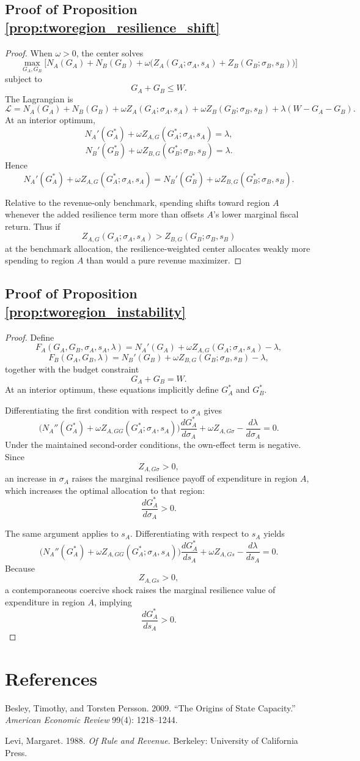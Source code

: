 \documentclass[12pt]{article}
\begin{document}
\subsection{Proof of Proposition \ref{prop:tworegion_resilience_shift}}

\begin{proof}
When $\omega>0$, the center solves
\[
\max_{G_A,G_B}
\Big[
N_A(G_A)+N_B(G_B)+\omega\bigl(Z_A(G_A;\sigma_A,s_A)+Z_B(G_B;\sigma_B,s_B)\bigr)
\Big]
\]
subject to
\[
G_A+G_B\le W.
\]
The Lagrangian is
\[
\mathcal L=
N_A(G_A)+N_B(G_B)+\omega Z_A(G_A;\sigma_A,s_A)+\omega Z_B(G_B;\sigma_B,s_B)
+\lambda(W-G_A-G_B).
\]
At an interior optimum,
\[
N_A'(G_A^*)+\omega Z_{A,G}(G_A^*;\sigma_A,s_A)=\lambda,
\]
\[
N_B'(G_B^*)+\omega Z_{B,G}(G_B^*;\sigma_B,s_B)=\lambda.
\]
Hence
\[
N_A'(G_A^*)+\omega Z_{A,G}(G_A^*;\sigma_A,s_A)
=
N_B'(G_B^*)+\omega Z_{B,G}(G_B^*;\sigma_B,s_B).
\]

Relative to the revenue-only benchmark, spending shifts toward region $A$ whenever the added resilience term more than offsets $A$'s lower marginal fiscal return. Thus if
\[
Z_{A,G}(G_A;\sigma_A,s_A)>Z_{B,G}(G_B;\sigma_B,s_B)
\]
at the benchmark allocation, the resilience-weighted center allocates weakly more spending to region $A$ than would a pure revenue maximizer.
\end{proof}

\subsection{Proof of Proposition \ref{prop:tworegion_instability}}

\begin{proof}
Define
\[
F_A(G_A,G_B,\sigma_A,s_A,\lambda)
=
N_A'(G_A)+\omega Z_{A,G}(G_A;\sigma_A,s_A)-\lambda,
\]
\[
F_B(G_A,G_B,\lambda)
=
N_B'(G_B)+\omega Z_{B,G}(G_B;\sigma_B,s_B)-\lambda,
\]
together with the budget constraint
\[
G_A+G_B=W.
\]
At an interior optimum, these equations implicitly define $G_A^*$ and $G_B^*$.

Differentiating the first condition with respect to $\sigma_A$ gives
\[
\Big(N_A''(G_A^*)+\omega Z_{A,GG}(G_A^*;\sigma_A,s_A)\Big)\frac{dG_A^*}{d\sigma_A}
+\omega Z_{A,G\sigma}
-\frac{d\lambda}{d\sigma_A}
=0.
\]
Under the maintained second-order conditions, the own-effect term is negative. Since
\[
Z_{A,G\sigma}>0,
\]
an increase in $\sigma_A$ raises the marginal resilience payoff of expenditure in region $A$, which increases the optimal allocation to that region:
\[
\frac{dG_A^*}{d\sigma_A}>0.
\]

The same argument applies to $s_A$. Differentiating with respect to $s_A$ yields
\[
\Big(N_A''(G_A^*)+\omega Z_{A,GG}(G_A^*;\sigma_A,s_A)\Big)\frac{dG_A^*}{ds_A}
+\omega Z_{A,Gs}
-\frac{d\lambda}{ds_A}
=0.
\]
Because
\[
Z_{A,Gs}>0,
\]
a contemporaneous coercive shock raises the marginal resilience value of expenditure in region $A$, implying
\[
\frac{dG_A^*}{ds_A}>0.
\]
\end{proof}

\section*{References}

Besley, Timothy, and Torsten Persson. 2009. ``The Origins of State Capacity.'' \emph{American Economic Review} 99(4): 1218--1244.

Levi, Margaret. 1988. \emph{Of Rule and Revenue}. Berkeley: University of California Press.
\end{document}
